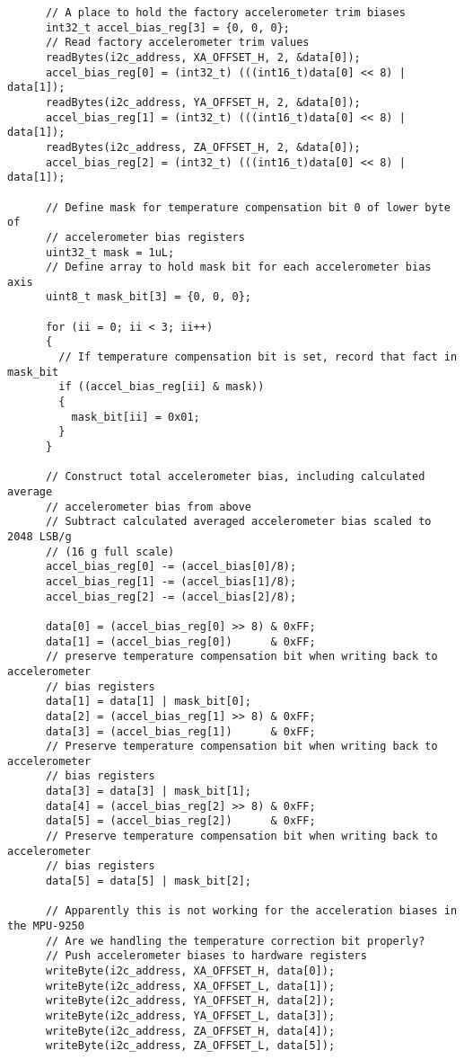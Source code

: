 \begin{lstlisting}
	  // A place to hold the factory accelerometer trim biases
	  int32_t accel_bias_reg[3] = {0, 0, 0};
	  // Read factory accelerometer trim values
	  readBytes(i2c_address, XA_OFFSET_H, 2, &data[0]);
	  accel_bias_reg[0] = (int32_t) (((int16_t)data[0] << 8) | data[1]);
	  readBytes(i2c_address, YA_OFFSET_H, 2, &data[0]);
	  accel_bias_reg[1] = (int32_t) (((int16_t)data[0] << 8) | data[1]);
	  readBytes(i2c_address, ZA_OFFSET_H, 2, &data[0]);
	  accel_bias_reg[2] = (int32_t) (((int16_t)data[0] << 8) | data[1]);

	  // Define mask for temperature compensation bit 0 of lower byte of
	  // accelerometer bias registers
	  uint32_t mask = 1uL;
	  // Define array to hold mask bit for each accelerometer bias axis
	  uint8_t mask_bit[3] = {0, 0, 0};

	  for (ii = 0; ii < 3; ii++)
	  {
	    // If temperature compensation bit is set, record that fact in mask_bit
	    if ((accel_bias_reg[ii] & mask))
	    {
	      mask_bit[ii] = 0x01;
	    }
	  }

	  // Construct total accelerometer bias, including calculated average
	  // accelerometer bias from above
	  // Subtract calculated averaged accelerometer bias scaled to 2048 LSB/g
	  // (16 g full scale)
	  accel_bias_reg[0] -= (accel_bias[0]/8);
	  accel_bias_reg[1] -= (accel_bias[1]/8);
	  accel_bias_reg[2] -= (accel_bias[2]/8);

	  data[0] = (accel_bias_reg[0] >> 8) & 0xFF;
	  data[1] = (accel_bias_reg[0])      & 0xFF;
	  // preserve temperature compensation bit when writing back to accelerometer
	  // bias registers
	  data[1] = data[1] | mask_bit[0];
	  data[2] = (accel_bias_reg[1] >> 8) & 0xFF;
	  data[3] = (accel_bias_reg[1])      & 0xFF;
	  // Preserve temperature compensation bit when writing back to accelerometer
	  // bias registers
	  data[3] = data[3] | mask_bit[1];
	  data[4] = (accel_bias_reg[2] >> 8) & 0xFF;
	  data[5] = (accel_bias_reg[2])      & 0xFF;
	  // Preserve temperature compensation bit when writing back to accelerometer
	  // bias registers
	  data[5] = data[5] | mask_bit[2];

	  // Apparently this is not working for the acceleration biases in the MPU-9250
	  // Are we handling the temperature correction bit properly?
	  // Push accelerometer biases to hardware registers
	  writeByte(i2c_address, XA_OFFSET_H, data[0]);
	  writeByte(i2c_address, XA_OFFSET_L, data[1]);
	  writeByte(i2c_address, YA_OFFSET_H, data[2]);
	  writeByte(i2c_address, YA_OFFSET_L, data[3]);
	  writeByte(i2c_address, ZA_OFFSET_H, data[4]);
	  writeByte(i2c_address, ZA_OFFSET_L, data[5]);


\end{lstlisting}
